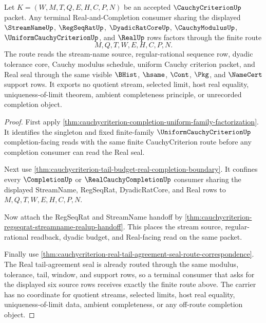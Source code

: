 \begin{theorem}
\label{thm:cauchycriterion-terminal-regseqrat-real-completion-route}
Let $K=(W,M,T,Q,E,H,C,P,N)$ be an accepted $\CauchyCriterionUp$ packet. Any terminal Real-and-Completion consumer sharing the displayed $\StreamNameUp$, $\RegSeqRatUp$, $\DyadicRatCoreUp$, $\CauchyModulusUp$, $\UniformCauchyCriterionUp$, and $\RealUp$ rows factors through the finite route
$$
M,Q,T,W,E,H,C,P,N.
$$
The route reads the stream-name source, regular-rational sequence row, dyadic tolerance core, Cauchy modulus schedule, uniform Cauchy criterion packet, and Real seal through the same visible $\BHist$, $\hsame$, $\Cont$, $\Pkg$, and $\NameCert$ support rows. It exports no quotient stream, selected limit, host real equality, uniqueness-of-limit theorem, ambient completeness principle, or unrecorded completion object.
\end{theorem}
\begin{proof}
First apply \autoref{thm:cauchycriterion-completion-uniform-family-factorization}. It identifies the singleton and fixed finite-family $\UniformCauchyCriterionUp$ completion-facing reads with the same finite CauchyCriterion route before any completion consumer can read the Real seal.

Next use \autoref{thm:cauchycriterion-tail-budget-real-completion-boundary}. It confines every $\CompletionUp$ or $\RealCauchyCompletionUp$ consumer sharing the displayed StreamName, RegSeqRat, DyadicRatCore, and Real rows to $M,Q,T,W,E,H,C,P,N$.

Now attach the RegSeqRat and StreamName handoff by \autoref{thm:cauchycriterion-regseqrat-streamname-realup-handoff}. This places the stream source, regular-rational readback, dyadic budget, and Real-facing read on the same packet.

Finally use \autoref{thm:cauchycriterion-real-tail-agreement-seal-route-correspondence}. The Real tail-agreement seal is already routed through the same modulus, tolerance, tail, window, and support rows, so a terminal consumer that asks for the displayed six source rows receives exactly the finite route above. The carrier has no coordinate for quotient streams, selected limits, host real equality, uniqueness-of-limit data, ambient completeness, or any off-route completion object.
\end{proof}

